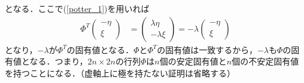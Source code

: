 となる．ここで(\ref{potter_1})を用いれば
\begin{align}
	\Phi^T 
		  \left(\begin{array}{c}
	        - \eta \\
	          \xi
	      \end{array}\right)
	&=
		  \left(\begin{array}{c}
	        \lambda \eta \\
	        - \lambda \xi
	      \end{array}\right)
	= -\lambda
		  \left(\begin{array}{c}
	        -\eta \\
	        \xi
	      \end{array}\right)
\end{align}
となり，$-\lambda$が$\Phi^T$の固有値となる．$\Phi$と$\Phi^T$の固有値は一致するから，$-\lambda$も$\Phi$の固有値となる．つまり，$2n \times 2n$の行列$\Phi$は$n$個の安定固有値と$n$個の不安定固有値を持つことになる．（虚軸上に極を持たない証明は省略する）

